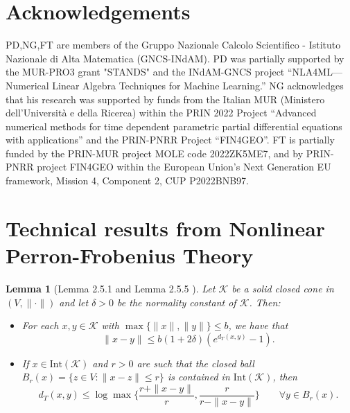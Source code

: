 \documentclass{article}
\newtheorem{lemma}[theorem]{Lemma}
\newcommand{\cone}{\mathcal{K}}
\newcommand{\interior}{\mathrm{Int}}
\newcommand{\distT}{d_T}
\begin{document}
\section{Acknowledgements}
PD,NG,FT are members of the Gruppo Nazionale Calcolo Scientifico - Istituto Nazionale di Alta Matematica (GNCS-INdAM). PD was partially supported by the MUR-PRO3 grant "STANDS" and the INdAM-GNCS project “NLA4ML—Numerical Linear Algebra Techniques for Machine Learning.” 
NG acknowledges that his research was supported by funds from the Italian  MUR (Ministero dell'Universit\`a e della Ricerca) within the 
PRIN 2022 Project ``Advanced numerical methods for time dependent parametric partial differential equations with applications'' and the PRIN-PNRR Project ``FIN4GEO''.
FT is partially funded by the PRIN-MUR project MOLE code 2022ZK5ME7, and by PRIN-PNRR project FIN4GEO within the European Union’s Next Generation EU framework, Mission 4, Component 2, CUP P2022BNB97.
 












\appendix

\section{Technical results from Nonlinear Perron-Frobenius Theory}\label{Appendix_nonlinear_Perron Frobenius}
%
%
\begin{lemma}[Lemma 2.5.1 and Lemma 2.5.5 \cite{lemmens2012nonlinear}]\label{Lemma_thompson_equivalent_to_norm}
    Let $\cone$ be a solid closed cone in $(V,\|\cdot\|)$ and let $\delta>0$ be the normality constant of $\cone$. Then:
    \begin{itemize}
        \item For each $x,y\in\cone$ with $\max\{\|x\|,\|y\|\}\leq b$, we have that 
    $$\|x-y\|\leq b(1+2\delta)(e^{\distT(x,y)}-1).$$
        \item If $x\in\interior(\cone)$ and $r>0$ are such that the closed ball $B_r(x)=\{z\in V:\|x-z\|\leq r\}$ is contained in $\interior(\cone)$, then 
    $$\distT(x,y)\leq \log \max\Big\{ \frac{r+\|x-y\|}{r},\frac{r}{r-\|x-y\|}  \Big\}\qquad \forall y\in B_r(x).$$
    \end{itemize}
\end{lemma}
\end{document}
